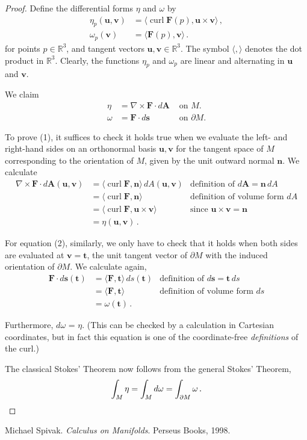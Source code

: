 \documentclass[12pt]{article}
\newcommand{\real}{\mathbb{R}}
\newcommand{\vF}{\mathbf{F}}
\newcommand{\vA}{\mathbf{A}}
\newcommand{\vs}{\mathbf{s}}
\newcommand{\vn}{\mathbf{n}}
\newcommand{\vt}{\mathbf{t}}
\newcommand{\vu}{\mathbf{u}}
\newcommand{\vv}{\mathbf{v}}
\DeclareMathOperator{\curl}{curl}
\begin{document}
\begin{proof}
Define the differential forms $\eta$ and $\omega$ by
\begin{align*}
\eta_p(\vu, \vv) &= \langle \curl \vF(p), \vu \times \vv \rangle\,, \\
\omega_p(\vv) &= \langle \vF(p), \vv \rangle\,.
\end{align*}
for points $p \in \real^3$, and tangent vectors $\vu, \vv \in \real^3$.
The symbol $\langle, \rangle$ denotes the dot product in $\real^3$.
Clearly, the functions $\eta_p$ and $\omega_p$ are linear and alternating in 
$\vu$ and $\vv$.

We claim 
\begin{align}
\eta &= \nabla \times \vF \cdot d\vA & \text{ on $M$. } \\
\omega &= \vF \cdot d\vs & \text{ on $\partial M$.}
\end{align}

To prove (1), it suffices to check
it holds true when we evaluate the left- and right-hand sides
on an orthonormal basis $\vu, \vv$ for the tangent space of $M$
corresponding to the orientation of $M$,
given by the unit outward normal $\vn$.
We calculate
\begin{align*}
\nabla \times \vF \cdot d\vA(\vu,\vv) &= 
\langle \curl \vF, \vn \rangle \,
dA(\vu, \vv) 
& \text{definition of $d\vA = \vn \, dA$}
\\
&= 
\langle \curl \vF, \vn \rangle 
& \text{definition of volume form $dA$}
\\
&= 
\langle \curl \vF, \vu \times \vv \rangle 
& \text{since $\vu \times \vv = \vn$} \\
&=
\eta(\vu, \vv)\,.
\end{align*}

For equation (2), similarly, we only have to check that it holds
when both sides are evaluated at $\vv = \vt$,
the unit tangent vector of $\partial M$
with the induced orientation of $\partial M$.
We calculate again,
\begin{align*}
\vF \cdot d\vs(\vt) &= \langle \vF, \vt \rangle \, ds(\vt) 
& \text{definition of $d\vs = \vt \, ds$} \\
&= \langle \vF, \vt \rangle 
& \text{definition of volume form $ds$} \\
&= \omega(\vt)\,.
\end{align*}

Furthermore, $d \omega$ = $\eta$.
(This can be checked by a calculation
in Cartesian coordinates, but in fact this equation
is one of the coordinate-free \emph{definitions} of the curl.)

The classical Stokes' Theorem now follows
from the general Stokes' Theorem,
\[
\int_M \eta = \int_M d\omega = \int_{\partial M} \omega\,. \qedhere
\]
\end{proof}

\begin{thebibliography}{3}
 Michael Spivak. {\it Calculus on Manifolds}. Perseus Books, 1998.
\end{thebibliography}
\end{document}
